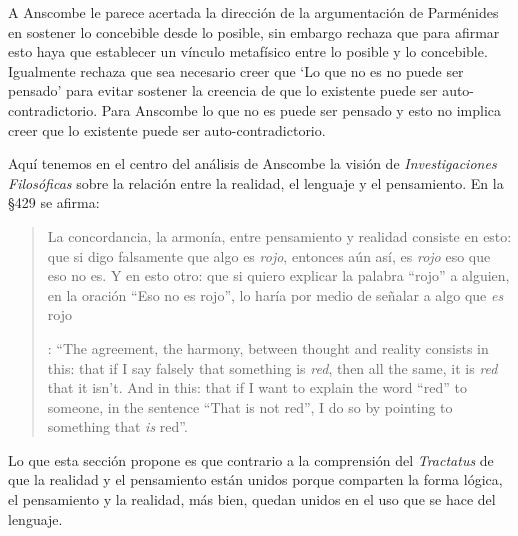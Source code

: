 A Anscombe le parece acertada la dirección de la argumentación de Parménides en sostener lo concebible desde lo posible, sin embargo rechaza que para afirmar esto haya que establecer un vínculo metafísico entre lo posible y lo concebible. Igualmente rechaza que sea necesario creer que \enquote*{Lo que no es no puede ser pensado} para evitar sostener la creencia de que lo existente puede ser auto-contradictorio. Para Anscombe lo que no es puede ser pensado y esto no implica creer que lo existente puede ser auto-contradictorio.

Aquí tenemos en el centro del análisis de Anscombe la visión de \emph{Investigaciones Filosóficas} sobre la relación entre la realidad, el lenguaje y el pensamiento. En la \S429 se afirma: \blockquote[{\Cite[\S429]{wittgenstein1953phiinv}}: \enquote{The agreement, the harmony, between thought and reality consists in this: that if I say falsely that something is \emph{red}, then all the same, it is \emph{red} that it isn't. And in this: that if I want to explain the word ``red'' to someone, in the sentence ``That is not red'', I do so by pointing to something that \emph{is} red}.]{La concordancia, la armonía, entre pensamiento y realidad consiste en esto: que si digo falsamente que algo es \emph{rojo}, entonces aún así, es \emph{rojo} eso que eso no es. Y en esto otro: que si quiero explicar la palabra ``rojo'' a alguien, en la oración ``Eso no es rojo'', lo haría por medio de señalar a algo que \emph{es} rojo}. Lo que esta sección propone es que contrario a la comprensión del \emph{Tractatus} de que la realidad y el pensamiento están unidos porque comparten la forma lógica, el pensamiento y la realidad, más bien, quedan unidos en el uso que se hace del lenguaje.

